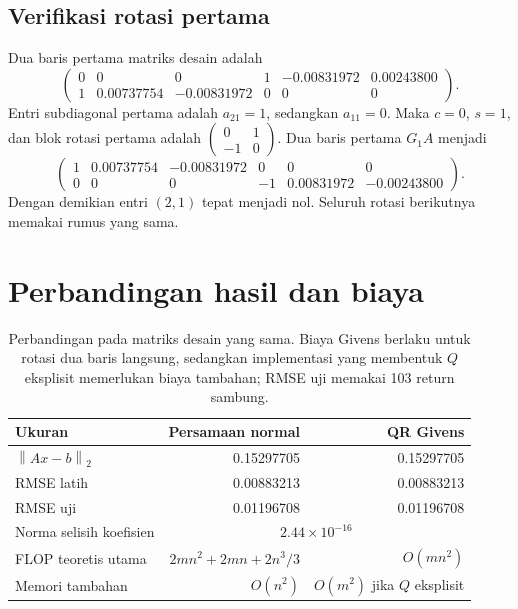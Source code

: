 \documentclass[12pt,a4paper]{article}
\numberwithin{equation}{section}
\newcommand{\norm}[1]{\left\lVert #1\right\rVert_2}
\begin{document}
\subsection*{Verifikasi rotasi pertama}
Dua baris pertama matriks desain adalah
\[
\begin{pmatrix}
0&0&0&1&-0.00831972&0.00243800\\
1&0.00737754&-0.00831972&0&0&0
\end{pmatrix}.
\]
Entri subdiagonal pertama adalah $a_{21}=1$, sedangkan $a_{11}=0$. Maka $c=0$, $s=1$, dan blok rotasi pertama adalah $\left(\begin{smallmatrix}0&1\\-1&0\end{smallmatrix}\right)$. Dua baris pertama $G_1A$ menjadi
\[
\begin{pmatrix}
1&0.00737754&-0.00831972&0&0&0\\
0&0&0&-1&0.00831972&-0.00243800
\end{pmatrix}.
\]
Dengan demikian entri $(2,1)$ tepat menjadi nol. Seluruh rotasi berikutnya memakai rumus yang sama.

\section{Perbandingan hasil dan biaya}
\begin{table}[H]
\centering
\caption{Perbandingan pada matriks desain yang sama. Biaya Givens berlaku untuk rotasi dua baris langsung, sedangkan implementasi yang membentuk $Q$ eksplisit memerlukan biaya tambahan; RMSE uji memakai 103 return sambung.}
\begin{tabular}{lrr}
\toprule
Ukuran & Persamaan normal & QR Givens\\
\midrule
$\norm{Ax-b}$ & 0.15297705 & 0.15297705\\
RMSE latih & 0.00883213 & 0.00883213\\
RMSE uji & 0.01196708 & 0.01196708\\
Norma selisih koefisien & \multicolumn{2}{c}{$2.44\times10^{-16}$}\\
FLOP teoretis utama & $2mn^2+2mn+2n^3/3$ & $O(mn^2)$\\
Memori tambahan & $O(n^2)$ & $O(m^2)$ jika $Q$ eksplisit\\
\bottomrule
\end{tabular}
\end{table}
\end{document}
